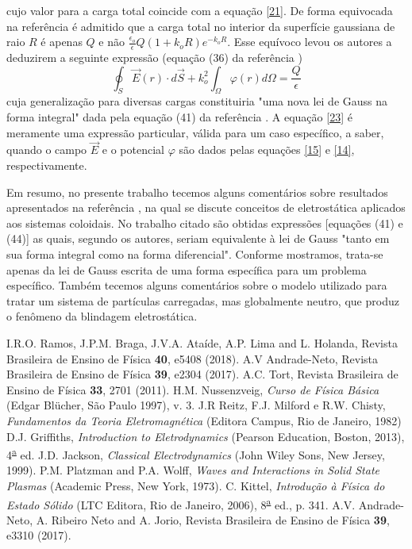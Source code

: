 \documentclass[brazilian,10.7pt,a4paper]{article}
\begin{document}
\begin{multicols}{2}
\begin{equation}
\end{equation}
cujo valor para a carga total coincide com a equação \eqref{21}. De forma equivocada na referência \cite{ramos} é admitido que a carga total no interior da superfície gaussiana de raio $R$ é apenas $Q$ e não $\frac{\epsilon_{o}}{\epsilon}Q(1+k_{o}R)e^{-k_{o}R}$. Esse equívoco levou os autores a deduzirem a seguinte expressão (equação (36) da referência \cite{ramos})
\\
\begin{equation}\label{23}
\oint_{S}{\vec{E}(r)\cdot d\vec{S}+k^{2}_{o}}\int_{\Omega}{\varphi(r)d\Omega}=\frac{Q}{\epsilon}
\end{equation}
cuja generalização para diversas cargas constituiria "uma nova lei de Gauss na forma integral" dada pela equação (41) da referência \cite{ramos}. A equação \eqref{23} é meramente uma expressão particular, válida para um caso específico, a saber, quando o campo $\vec{E}$ e o potencial $\varphi$ são dados pelas equações \eqref{15} e \eqref{14}, respectivamente.
\par Em resumo, no presente trabalho tecemos alguns comentários sobre resultados apresentados na referência \cite{ramos}, na qual se discute conceitos de eletrostática aplicados aos sistemas coloidais. No trabalho citado são obtidas expressões [equações (41) e (44)] as quais, segundo os autores, seriam equivalente à lei de Gauss "tanto em sua forma integral como na forma diferencial". Conforme mostramos, trata-se apenas da lei de Gauss escrita de uma forma específica para um problema específico. Também tecemos alguns comentários sobre o modelo utilizado para tratar um sistema de partículas carregadas, mas globalmente neutro, que produz o fenômeno da blindagem eletrostática.
\\
\begin{thebibliography}{10}
I.R.O. Ramos, J.P.M. Braga, J.V.A. Ataíde, A.P. Lima and L. Holanda, Revista Brasileira de Ensino de Física \textbf{40}, e5408 (2018).
A.V Andrade-Neto, Revista Brasileira de Ensino de Física \textbf{39}, e2304 (2017).
A.C. Tort, Revista Brasileira de Ensino de Física \textbf{33}, 2701 (2011).
H.M. Nussenzveig, \textit{Curso de Física Básica} (Edgar Blücher, São Paulo 1997), v. 3.
J.R Reitz, F.J. Milford e R.W. Chisty, \textit{Fundamentos da Teoria Eletromagnética} (Editora Campus, Rio de Janeiro, 1982)
D.J. Griffiths, \textit{Introduction to Eletrodynamics} (Pearson Education, Boston, 2013), 4\textsuperscript{\underline{a}} ed.
J.D. Jackson, \textit{Classical Electrodynamics} (John Wiley Sons, New Jersey, 1999).
P.M. Platzman and P.A. Wolff, \textit{Waves and Interactions in Solid State Plasmas} (Academic Press, New York, 1973).
C. Kittel, \textit{Introdução à Física do Estado Sólido} (LTC Editora, Rio de Janeiro, 2006), 8\textsuperscript{\underline{a}} ed., p. 341.
A.V. Andrade-Neto, A. Ribeiro Neto and A. Jorio, Revista Brasileira de Ensino de Física \textbf{39}, e3310 (2017).
\end{thebibliography}
\end{multicols}
\end{document}
